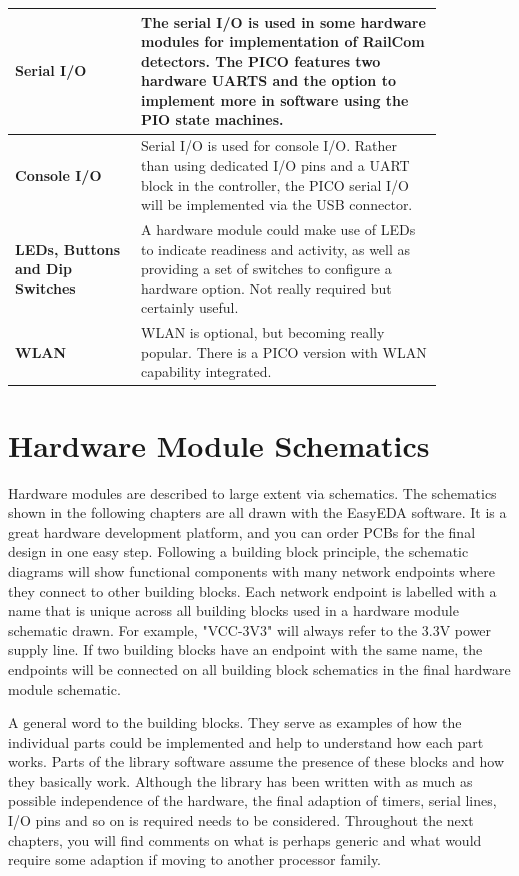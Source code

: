 \begin{longtable}{@{}p{0.25\linewidth}p{0.6\linewidth}@{}}
    \midrule
    \textbf{Serial I/O} & The serial I/O is used in some hardware modules for implementation of RailCom detectors. The PICO features two hardware UARTS and the option to implement more in software using the PIO state machines. \\
    \midrule
    \textbf{Console I/O} & Serial I/O is used for console I/O. Rather than using dedicated I/O pins and a UART block in the controller, the PICO serial I/O will be implemented via the USB connector. \\
    \midrule
    \textbf{LEDs, Buttons and Dip Switches} & A hardware module could make use of LEDs to indicate readiness and activity, as well as providing a set of switches to configure a hardware option. Not really required but certainly useful. \\
    \midrule
    \textbf{WLAN} & WLAN is optional, but becoming really popular. There is a PICO version with WLAN capability integrated. \\
\end{longtable}

\section{Hardware Module Schematics}

Hardware modules are described to large extent via schematics. The schematics shown in the following chapters are all drawn with the EasyEDA software. It is a great hardware development platform, and you can order PCBs for the final design in one easy step. Following a building block principle, the schematic diagrams will show functional components with many network endpoints where they connect to other building blocks. Each network endpoint is labelled with a name that is unique across all building blocks used in a hardware module schematic drawn. For example, "VCC-3V3" will always refer to the 3.3V power supply line. If two building blocks have an endpoint with the same name, the endpoints will be connected on all building block schematics in the final hardware module schematic.

A general word to the building blocks. They serve as examples of how the individual parts could be implemented and help to understand how each part works. Parts of the library software assume the presence of these blocks and how they basically work. Although the library has been written with as much as possible independence of the hardware, the final adaption of timers, serial lines, I/O pins and so on is required needs to be considered. Throughout the next chapters, you will find comments on what is perhaps generic and what would require some adaption if moving to another processor family.

